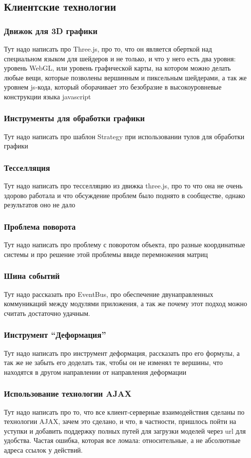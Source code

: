 \documentclass[12pt, a4paper]{article}
\begin{document}
\subsection{Клиентские технологии}
\subsubsection{Движок для 3D графики}
Тут надо написать про Three.js, про то, что он является оберткой над специальном
языком для шейдеров и не только, и что у него есть два уровня: уровень WebGL,
или уровень графической карты, на котором можно делать любые вещи, которые
позволены вершинным и пиксельным шейдерами, а так же уровнем js-кода, который
оборачивает это безобразие в высокоуровневые конструкции языка javascript

\subsubsection{Инструменты для обработки графики}
Тут надо написать про шаблон Strategy при использовании
тулов для обработки графики
\subsubsection{Тесселляция}
Тут надо написать про тесселляцию из движка three.js, про то
что она не очень здорово работала и что обсуждение проблем было поднято в
сообществе, однако результатов оно не дало
\subsubsection{Проблема поворота}
Тут надо написать про проблему с поворотом объекта, про разные
координатные системы и про решение этой проблемы ввиде перемножения
матриц
\subsubsection{Шина событий}
Тут надо рассказать про EventBus, про обеспечение двунаправленных
коммуникаций между модулями приложения, а так же почему этот подход
можно считать достаточно удачным.
\subsubsection{Инструмент ``Деформация''}
Тут надо написать про инструмент деформация, рассказать про его формулы,
а так же не забыть его доделать так, чтобы он не изменял те вершины, что
находятся в другом направлении от направления деформации
\subsubsection{Использование технологии AJAX}
Тут надо написать про то, что все клиент-серверные взаимодействия сделаны по
технологии AJAX, зачем это сделано, и что, в частности, пришлось пойти на
уступки и добавить поддержку полных путей для загрузки моделей через url для
удобства. Частая ошибка, которая все ломала: относительные, а не абсолютные
адреса ссылок у действий.
\end{document}
